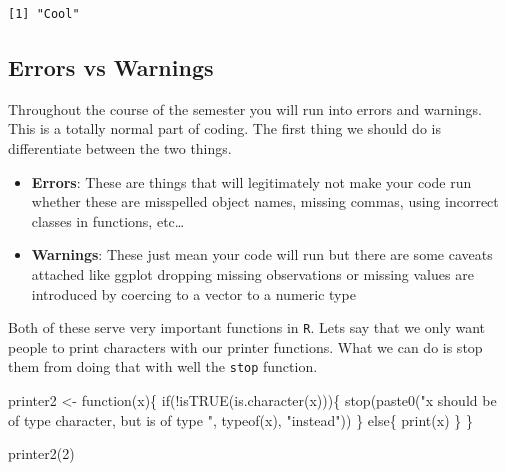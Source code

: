 \documentclass[
  letterpaper,
  DIV=11,
  numbers=noendperiod,
  oneside]{scrreprt}
\newenvironment{Shaded}{\begin{snugshade}}{\end{snugshade}}
\newcommand{\ControlFlowTok}[1]{\textcolor[rgb]{0.00,0.23,0.31}{#1}}
\newcommand{\DecValTok}[1]{\textcolor[rgb]{0.68,0.00,0.00}{#1}}
\newcommand{\FunctionTok}[1]{\textcolor[rgb]{0.28,0.35,0.67}{#1}}
\newcommand{\NormalTok}[1]{\textcolor[rgb]{0.00,0.23,0.31}{#1}}
\newcommand{\OtherTok}[1]{\textcolor[rgb]{0.00,0.23,0.31}{#1}}
\newcommand{\SpecialCharTok}[1]{\textcolor[rgb]{0.37,0.37,0.37}{#1}}
\newcommand{\StringTok}[1]{\textcolor[rgb]{0.13,0.47,0.30}{#1}}
\begin{document}
\begin{verbatim}
[1] "Cool"
\end{verbatim}

\hypertarget{errors-vs-warnings}{%
\subsection{Errors vs Warnings}\label{errors-vs-warnings}}

Throughout the course of the semester you will run into errors and
warnings. This is a totally normal part of coding. The first thing we
should do is differentiate between the two things.

\begin{itemize}
\item
  \textbf{Errors}: These are things that will legitimately not make your
  code run whether these are misspelled object names, missing commas,
  using incorrect classes in functions, etc\ldots{}
\item
  \textbf{Warnings}: These just mean your code will run but there are
  some caveats attached like ggplot dropping missing observations or
  missing values are introduced by coercing to a vector to a numeric
  type
\end{itemize}

Both of these serve very important functions in \texttt{R}. Lets say
that we only want people to print characters with our printer functions.
What we can do is stop them from doing that with well the \texttt{stop}
function.

\begin{Shaded}
\begin{Highlighting}[]
\NormalTok{printer2 }\OtherTok{\textless{}{-}} \ControlFlowTok{function}\NormalTok{(x)\{}
  \ControlFlowTok{if}\NormalTok{(}\SpecialCharTok{!}\FunctionTok{isTRUE}\NormalTok{(}\FunctionTok{is.character}\NormalTok{(x)))\{}
    \FunctionTok{stop}\NormalTok{(}\FunctionTok{paste0}\NormalTok{(}\StringTok{"x should be of type \textquotesingle{}character\textquotesingle{}, but is of type \textquotesingle{}"}\NormalTok{, }\FunctionTok{typeof}\NormalTok{(x), }\StringTok{"\textquotesingle{}instead"}\NormalTok{))}
\NormalTok{  \}}
  \ControlFlowTok{else}\NormalTok{\{}
    \FunctionTok{print}\NormalTok{(x)}
\NormalTok{  \}}
\NormalTok{\}}

\FunctionTok{printer2}\NormalTok{(}\DecValTok{2}\NormalTok{)}
\end{Highlighting}
\end{Shaded}
\end{document}
